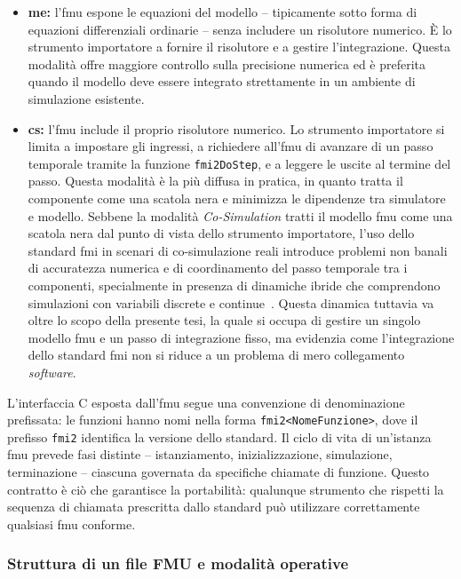 \begin{itemize}
    \item \textbf{\ac{me}:} l'\ac{fmu} espone le equazioni del modello -- tipicamente sotto forma di equazioni differenziali ordinarie -- senza includere un risolutore numerico. È lo strumento importatore a fornire il risolutore e a gestire l'integrazione. Questa modalità offre maggiore controllo sulla precisione numerica ed è preferita quando il modello deve essere integrato strettamente in un ambiente di simulazione esistente.

    \item \textbf{\ac{cs}:} l'\ac{fmu} include il proprio risolutore numerico. Lo strumento importatore si limita a impostare gli ingressi, a richiedere all'\ac{fmu} di avanzare di un passo temporale tramite la funzione \texttt{fmi2DoStep}, e a leggere le uscite al termine del passo. Questa modalità è la più diffusa in pratica, in quanto tratta il componente come una scatola nera e minimizza le dipendenze tra simulatore e modello. Sebbene la modalità \textit{Co-Simulation} tratti il modello \ac{fmu} come una scatola nera dal punto di vista dello strumento importatore, l'uso dello standard \ac{fmi} in scenari di co-simulazione reali introduce problemi non banali di accuratezza numerica e di coordinamento del passo temporale tra i componenti, specialmente in presenza di dinamiche ibride che comprendono simulazioni con variabili discrete e continue~\cite{DBLP:conf/memocode/CremonaLBNLT16}. Questa dinamica tuttavia va oltre lo scopo della presente tesi, la quale si occupa di gestire un singolo modello \ac{fmu} e un passo di integrazione fisso, ma evidenzia come l'integrazione dello standard \ac{fmi} non si riduce a un problema di mero collegamento \textit{software}.
\end{itemize}

L'interfaccia C esposta dall'\ac{fmu} segue una convenzione di denominazione prefissata: le funzioni hanno nomi nella forma \texttt{fmi2<NomeFunzione>}, dove il prefisso \texttt{fmi2} identifica la versione dello standard. Il ciclo di vita di un'istanza \ac{fmu} prevede fasi distinte -- istanziamento, inizializzazione, simulazione, terminazione -- ciascuna governata da specifiche chiamate di funzione. Questo contratto è ciò che garantisce la portabilità: qualunque strumento che rispetti la sequenza di chiamata prescritta dallo standard può utilizzare correttamente qualsiasi \ac{fmu} conforme.

\subsubsection{Struttura di un file FMU e modalità operative}
\label{subsec:background-fmu-struttura}

